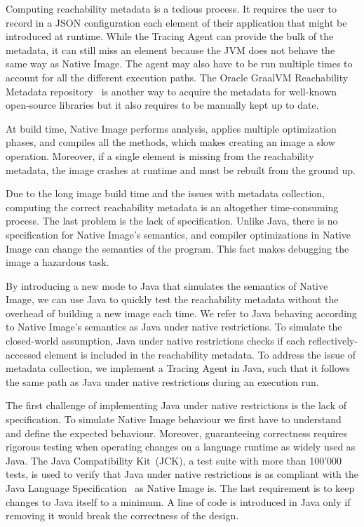 Computing reachability metadata is a tedious process. It requires the user to record in a JSON configuration each element of their application that might be introduced at runtime. While the Tracing Agent can provide the bulk of the metadata, it can still miss an element because the JVM does not behave the same way as Native Image. The agent may also have to be run multiple times to account for all the different execution paths. The Oracle GraalVM Reachability Metadata repository~\cite{noauthor_oraclegraalvm-reachability-metadata_2024} is another way to acquire the metadata for well-known open-source libraries but it also requires to be manually kept up to date.

At build time, Native Image performs analysis, applies multiple optimization phases, and compiles all the methods, which makes creating an image a slow operation.
Moreover, if a single element is missing from the reachability metadata, the image crashes at runtime and must be rebuilt from the ground up. 

Due to the long image build time and the issues with metadata collection, computing the correct reachability metadata is an altogether time-consuming process. 
The last problem is the lack of specification. Unlike Java, there is no specification for Native Image's semantics, and compiler optimizations in Native Image can change the semantics of the program. This fact makes debugging the image a hazardous task.

By introducing a new mode to Java that simulates the semantics of Native Image, we can use Java to quickly test the reachability metadata without the overhead of building a new image each time. We refer to Java behaving according to Native Image's semantics as Java under native restrictions.
To simulate the closed-world assumption, Java under native restrictions checks if each reflectively-accessed element is included in the reachability metadata. To address the issue of metadata collection, we implement a Tracing Agent in Java, such that it follows the same path as Java under native restrictions during an execution run.

The first challenge of implementing Java under native restrictions is the lack of specification. To simulate Native Image behaviour we first have to understand and define the expected behaviour. Moreover, guaranteeing correctness requires rigorous testing when operating changes on a language runtime as widely used as Java. The Java Compatibility Kit~(JCK), a test suite with more than 100'000 tests, is used to verify that Java under native restrictions is as compliant with the Java Language Specification~\cite{noauthor_java_nodate-2} as Native Image is.
The last requirement is to keep changes to Java itself to a minimum. A line of code is introduced in Java only if removing it would break the correctness of the design.

